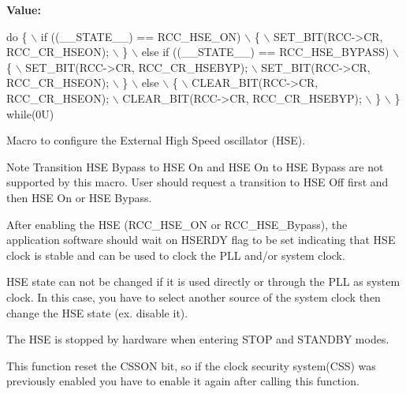 {\bfseries Value\+:}
\begin{DoxyCode}
\textcolor{keywordflow}{do} \{                                        \(\backslash\)
                      if ((\_\_STATE\_\_) == RCC\_HSE\_ON)            \(\backslash\)
                      \{                                         \(\backslash\)
                        SET\_BIT(RCC->CR, RCC\_CR\_HSEON);         \(\backslash\)
                      \}                                         \(\backslash\)
                      else \textcolor{keywordflow}{if} ((\_\_STATE\_\_) == RCC\_HSE\_BYPASS)   \(\backslash\)
                      \{                                         \(\backslash\)
                        SET\_BIT(RCC->CR, RCC\_CR\_HSEBYP);        \(\backslash\)
                        SET\_BIT(RCC->CR, RCC\_CR\_HSEON);         \(\backslash\)
                      \}                                         \(\backslash\)
                      else                                      \(\backslash\)
                      \{                                         \(\backslash\)
                        CLEAR\_BIT(RCC->CR, RCC\_CR\_HSEON);       \(\backslash\)
                        CLEAR\_BIT(RCC->CR, RCC\_CR\_HSEBYP);      \(\backslash\)
                      \}                                         \(\backslash\)
                    \} \textcolor{keywordflow}{while}(0U)
\end{DoxyCode}


Macro to configure the External High Speed oscillator (H\+SE). 

\begin{DoxyNote}{Note}
Transition H\+SE Bypass to H\+SE On and H\+SE On to H\+SE Bypass are not supported by this macro. User should request a transition to H\+SE Off first and then H\+SE On or H\+SE Bypass. 

After enabling the H\+SE (R\+C\+C\+\_\+\+H\+S\+E\+\_\+\+ON or R\+C\+C\+\_\+\+H\+S\+E\+\_\+\+Bypass), the application software should wait on H\+S\+E\+R\+DY flag to be set indicating that H\+SE clock is stable and can be used to clock the P\+LL and/or system clock. 

H\+SE state can not be changed if it is used directly or through the P\+LL as system clock. In this case, you have to select another source of the system clock then change the H\+SE state (ex. disable it). 

The H\+SE is stopped by hardware when entering S\+T\+OP and S\+T\+A\+N\+D\+BY modes. 

This function reset the C\+S\+S\+ON bit, so if the clock security system(\+C\+S\+S) was previously enabled you have to enable it again after calling this function. 
\end{DoxyNote}

